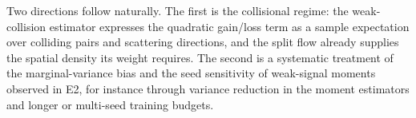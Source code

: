 \documentclass[11pt]{article}
\theoremstyle{plain}
\begin{document}
Two directions follow naturally. The first is the collisional regime: the weak-collision estimator expresses the quadratic gain/loss term as a sample expectation over colliding pairs and scattering directions, and the split flow already supplies the spatial density its weight requires. The second is a systematic treatment of the marginal-variance bias and the seed sensitivity of weak-signal moments observed in E2, for instance through variance reduction in the moment estimators and longer or multi-seed training budgets.






\end{document}
